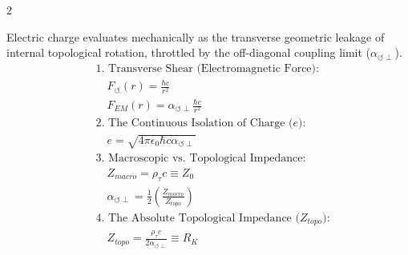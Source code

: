 \documentclass[11pt, a4paper]{article}
\newcounter{cheatnum}
\begin{document}
\begin{multicols}{2}
\begin{tcolorbox}[cheatbox, title={\refstepcounter{cheatnum}\label{box:fine_structure}\thecheatnum. The Topological Coupling Limit ($\alpha_{\circlearrowleft \perp}$) \& Charge \scriptsize\hfill\hyperref[sec:deriv_fine_structure]{[Proof $\downarrow$]}}]
Electric charge evaluates mechanically as the transverse geometric leakage of internal topological rotation, throttled by the off-diagonal coupling limit ($\alpha_{\circlearrowleft \perp}$).
\begin{align}
    &\text{1. Transverse Shear (Electromagnetic Force):} \nonumber \\
    &\quad F_{\circlearrowleft}(r) = \frac{\hbar c}{r^2} \label{eq:internal_rotational_force} \\
    &\quad F_{EM}(r) = \alpha_{\circlearrowleft \perp} \frac{\hbar c}{r^2} \label{eq:electromagnetic_leakage} \\
    &\text{2. The Continuous Isolation of Charge ($e$):} \nonumber \\
    &\quad e = \sqrt{4\pi \epsilon_0 \hbar c \alpha_{\circlearrowleft \perp}} \label{eq:alpha_continuum_derived} \\
    &\text{3. Macroscopic vs. Topological Impedance:} \nonumber \\
    &\quad Z_{macro} = \rho_{\tau} c \equiv Z_0 \label{eq:macroscopic_impedance} \\
    &\quad \alpha_{\circlearrowleft \perp} = \frac{1}{2} \left( \frac{Z_{macro}}{Z_{topo}} \right) \label{eq:tensor_coupling_derivation} \\
    &\text{4. The Absolute Topological Impedance ($Z_{topo}$):} \nonumber \\
    &\quad Z_{topo} = \frac{\rho_{\tau} c}{2 \alpha_{\circlearrowleft \perp}} \equiv R_K \label{eq:topological_impedance}
\end{align}
\end{tcolorbox}


\end{multicols}
\end{document}
